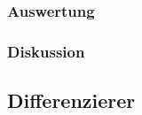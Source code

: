 \documentclass[12pt,a4paper]{article}
\begin{document}
\subsubsection{Auswertung}
\subsubsection{Diskussion}



\subsection{Differenzierer}
\end{document}
